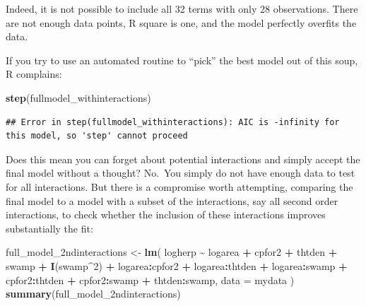 \documentclass[
  12pt,
]{book}
\newenvironment{Shaded}{\begin{snugshade}}{\end{snugshade}}
\newcommand{\DataTypeTok}[1]{\textcolor[rgb]{0.13,0.29,0.53}{#1}}
\newcommand{\DecValTok}[1]{\textcolor[rgb]{0.00,0.00,0.81}{#1}}
\newcommand{\KeywordTok}[1]{\textcolor[rgb]{0.13,0.29,0.53}{\textbf{#1}}}
\newcommand{\NormalTok}[1]{#1}
\newcommand{\OperatorTok}[1]{\textcolor[rgb]{0.81,0.36,0.00}{\textbf{#1}}}
\newcommand{\StringTok}[1]{\textcolor[rgb]{0.31,0.60,0.02}{#1}}
\begin{document}
Indeed, it is not possible to include all 32 terms with only 28 observations. There are not enough data points, R square is one, and the model perfectly overfits the data.

If you try to use an automated routine to ``pick'' the best model out of this soup, R complains:

\begin{Shaded}
\begin{Highlighting}[]
\KeywordTok{step}\NormalTok{(fullmodel\_withinteractions)}
\end{Highlighting}
\end{Shaded}

\begin{verbatim}
## Error in step(fullmodel_withinteractions): AIC is -infinity for this model, so 'step' cannot proceed
\end{verbatim}

Does this mean you can forget about potential interactions and simply accept the final model without a thought? No.~You simply do not have enough data to test for all interactions. But there is a compromise worth attempting, comparing the final model to a model with a subset of the interactions, say all second order interactions, to check whether the inclusion of these interactions improves substantially the fit:

\begin{Shaded}
\begin{Highlighting}[]
\NormalTok{full\_model\_2ndinteractions \textless{}{-}}\StringTok{ }\KeywordTok{lm}\NormalTok{(}
\NormalTok{  logherp }\OperatorTok{\textasciitilde{}}\StringTok{ }\NormalTok{logarea }\OperatorTok{+}\StringTok{ }\NormalTok{cpfor2 }\OperatorTok{+}\StringTok{ }\NormalTok{thtden }\OperatorTok{+}\StringTok{ }\NormalTok{swamp }\OperatorTok{+}\StringTok{ }\KeywordTok{I}\NormalTok{(swamp}\OperatorTok{\^{}}\DecValTok{2}\NormalTok{)}
    \OperatorTok{+}\StringTok{ }\NormalTok{logarea}\OperatorTok{:}\NormalTok{cpfor2}
    \OperatorTok{+}\StringTok{ }\NormalTok{logarea}\OperatorTok{:}\NormalTok{thtden}
    \OperatorTok{+}\StringTok{ }\NormalTok{logarea}\OperatorTok{:}\NormalTok{swamp}
    \OperatorTok{+}\StringTok{ }\NormalTok{cpfor2}\OperatorTok{:}\NormalTok{thtden}
    \OperatorTok{+}\StringTok{ }\NormalTok{cpfor2}\OperatorTok{:}\NormalTok{swamp}
    \OperatorTok{+}\StringTok{ }\NormalTok{thtden}\OperatorTok{:}\NormalTok{swamp,}
  \DataTypeTok{data =}\NormalTok{ mydata}
\NormalTok{)}
\KeywordTok{summary}\NormalTok{(full\_model\_2ndinteractions)}
\end{Highlighting}
\end{Shaded}
\end{document}
